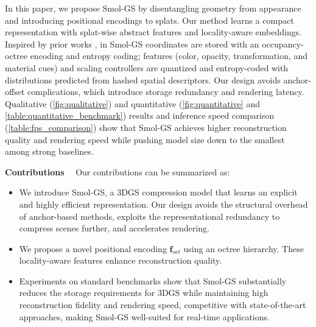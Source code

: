 \documentclass{article}
\def\vf{{\bm{f}}}
\newcommand{\ours}{Smol-GS\xspace}
\renewcommand{\paragraph}[1]{\noindent\textbf{#1}~~}
\begin{document}
In this paper, we propose \ours by disentangling geometry from appearance and introducing positional encodings to splats. Our method learns a compact representation with splat-wise abstract features and locality-aware embeddings. Inspired by prior works \citep{lu2024scaffoldgs,schnabel2006octree,chen2024hac}, in \ours coordinates are stored with an occupancy-octree encoding and entropy coding; features (color, opacity, transformation, and material cues) and scaling controllers are quantized and entropy-coded with distributions predicted from hashed spatial descriptors. Our design avoids anchor-offset complications, which introduce storage redundancy and rendering latency. Qualitative (\cref{fig:qualitative}) and quantitative (\cref{fig:quantitative} and \cref{table:quantitative_benchmark}) results and inference speed comparison (\cref{table:fps_comparison}) show that \ours achieves higher reconstruction quality and rendering speed while pushing model size down to the smallest among strong baselines.

\paragraph{Contributions} Our contributions can be summarized as:
\begin{itemize}[leftmargin=1.5em]
\item We introduce \ours, a 3DGS compression model that learns an explicit and highly efficient representation. Our design avoids the structural overhead of anchor-based methods, exploits the representational redundancy to compress scenes further, and accelerates rendering.
\item We propose a novel positional encoding $\vf_{oct}$ using an octree hierarchy. These locality-aware features enhance reconstruction quality.
\item Experiments on standard benchmarks show that \ours substantially reduces the storage requirements for 3DGS while maintaining high reconstruction fidelity and rendering speed, competitive with state-of-the-art approaches, making \ours well-suited for real-time applications.
\end{itemize}



%

%
%
%
%

%

%



%


%
\end{document}
